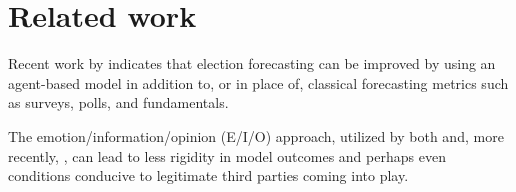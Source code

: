 \section{Related work}
\label{sec:related}

Recent work by \cite{gao_forecasting_2022} indicates that election forecasting
can be improved by using an agent-based model in addition to, or in place of,
classical forecasting metrics such as surveys, polls, and fundamentals.

The emotion/information/opinion (E/I/O) approach, utilized by both
\cite{sobkowicz_quantitative_2016} and, more recently,
\cite{burke_quantitatively_2022}, can lead to less rigidity in model outcomes
and perhaps even conditions conducive to legitimate third parties coming into
play.
